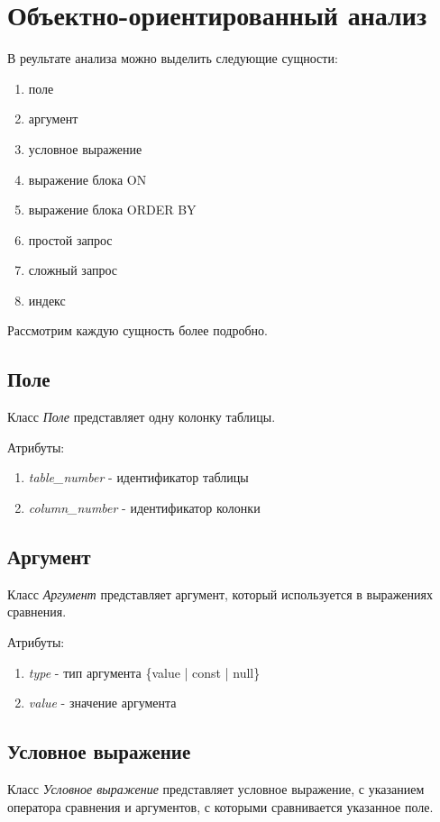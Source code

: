 \section{Объектно-ориентированный анализ}

В реультате анализа можно выделить следующие сущности:

\begin{enumerate}
\item поле
\item аргумент
\item условное выражение
\item выражение блока ON
\item выражение блока ORDER BY
\item простой запрос
\item сложный запрос
\item индекс
\end{enumerate}

Рассмотрим каждую сущность более подробно.

\subsection{Поле}
Класс \textit{Поле} представляет одну колонку таблицы.

Атрибуты:
\begin{enumerate}
\item \textit{table_number} - идентификатор таблицы
\item \textit{column_number} - идентификатор колонки
\end{enumerate}


\subsection{Аргумент}
Класс \textit{Аргумент} представляет аргумент, который используется в выражениях сравнения.

Атрибуты:
\begin{enumerate}
\item \textit{type} - тип аргумента \{value | const | null\}
\item \textit{value} - значение аргумента
\end{enumerate}


\subsection{Условное выражение}

Класс \textit{Условное выражение} представляет условное выражение, с указанием оператора сравнения и аргументов, с которыми сравнивается указанное поле.

